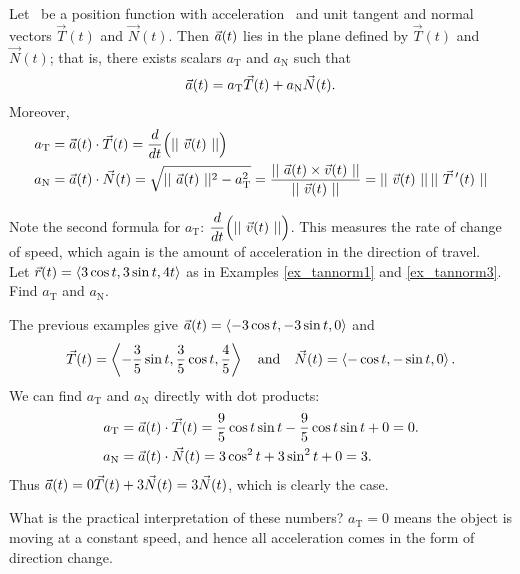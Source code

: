 \setboxwidth{20pt}
{Let \vrt\ be a position function with acceleration \vat\ and unit tangent and normal vectors $\vec T(t)$ and $\vec N(t)$. Then $\vec a(t)$ lies in the plane defined by $\vec T(t)$ and $\vec N(t)$; that is, there exists scalars $a_\text{T}$ and $a_\text{N}$ such that
$$\vec a(t) = a_\text{T}\vec T(t) + a_\text{N}\vec N(t).$$
Moreover,
\begin{align*}
a_\text{T} &= \vec a(t)\cdot\vec T(t) = \frac{d}{dt}\Big(||\ \vec v(t)\ ||\Big) \\
a_\text{N} &= \vec a(t)\cdot \vec N(t) = \sqrt{||\ \vec a(t)\ ||^2-a_\text{T}^2} = \frac{||\ \vec a(t)\times\vec v(t)\ ||}{||\ \vec v(t)\ ||} = ||\ \vec v(t)\ ||\,||\ \vec T\,'(t)\ ||
\end{align*}
}
\restoreboxwidth
{}

Note the second formula for $a_\text{T}$: $\displaystyle \frac{d}{dt}\Big(||\ \vec v(t)\ ||\Big)$. This measures the rate of change of speed, which again is the amount of acceleration in the direction of travel.\\

{Let $\vec r(t) = \left\langle 3\cos t, 3\sin t, 4t\right\rangle$ as in Examples \ref{ex_tannorm1} and \ref{ex_tannorm3}. Find $a_\text{T}$ and $a_\text{N}$.}
{The previous examples give $\vec a(t) = \left\langle -3\cos t,-3\sin t,0\right\rangle$ and 
$$\vec T(t) = \left\langle -\frac35\sin t,\frac35\cos t,\frac45\right\rangle \quad \text{and}\quad \vec N(t) = \left\langle -\cos t,-\sin t,0\right\rangle.$$
We can find $a_\text{T}$ and $a_\text{N}$ directly with dot products:
\begin{align*}
a_\text{T} &= \vec a(t)\cdot \vec T(t) = \frac95\cos t\sin t-\frac95\cos t\sin t+0 = 0.\\
a_\text{N} &= \vec a(t)\cdot \vec N(t) = 3\cos^2t+3\sin^2t + 0 = 3.
\end{align*}
Thus $\vec a(t) = 0\vec T(t) + 3\vec N(t) = 3\vec N(t)$, which is clearly the case.

What is the practical interpretation of these numbers? $a_\text{T}=0$ means the object is moving at a constant speed, and hence all acceleration comes in the form of direction change.
}\\


